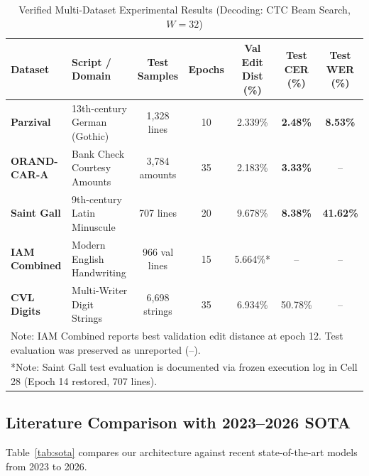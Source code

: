 \documentclass[default,iicol,sn-basic]{sn-jnl}
\begin{document}
{\begin{table}[t]
\caption{Verified Multi-Dataset Experimental Results (Decoding: CTC Beam Search, $W=32$)}\label{tab:benchmark}
\begin{tabular*}{\textwidth}{@{\extracolsep\fill}llccccc@{\extracolsep\fill}}
\toprule
Dataset & Script / Domain & Test Samples & Epochs & Val Edit Dist (\%) & Test CER (\%) & Test WER (\%) \\
\midrule
\textbf{Parzival}     & 13th-century German (Gothic) & 1,328 lines   & 10 & 2.339\% & \textbf{2.48\%} & \textbf{8.53\%} \\
\textbf{ORAND-CAR-A}  & Bank Check Courtesy Amounts  & 3,784 amounts & 35 & 2.183\% & \textbf{3.33\%} & -- \\
\textbf{Saint Gall}   & 9th-century Latin Minuscule  & 707 lines     & 20 & 9.678\% & \textbf{8.38\%} & \textbf{41.62\%} \\
\textbf{IAM Combined} & Modern English Handwriting   & 966 val lines & 15 & 5.664\%*& --              & -- \\
\textbf{CVL Digits}   & Multi-Writer Digit Strings   & 6,698 strings & 35 & 6.934\% & 50.78\%         & -- \\
\bottomrule
\multicolumn{7}{l}{\footnotesize *Note: IAM Combined reports best validation edit distance at epoch 12. Test evaluation was preserved as unreported (--).} \\
\multicolumn{7}{l}{\footnotesize **Note: Saint Gall test evaluation is documented via frozen execution log in Cell 28 (Epoch 14 restored, 707 lines).} \\
\end{tabular*}
\end{table}

\subsection{Literature Comparison with 2023–2026 SOTA}
Table~\ref{tab:sota} compares our architecture against recent state-of-the-art models from 2023 to 2026.

}
\end{document}
